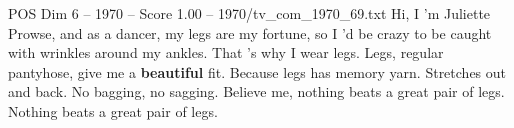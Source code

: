 \begin{textsample}{POS Dim 6 – 1970 – Score 1.00 – 1970/tv\_com\_1970\_69.txt}  \label{ex:f6_pos_035}
Hi, I 'm Juliette Prowse, and as a dancer, my legs are my fortune, so I 'd be crazy to be caught with wrinkles around my ankles.
That 's why I wear legs.
Legs, regular pantyhose, give me a \textbf{beautiful} fit.
Because legs has memory yarn.
Stretches out and back.
No bagging, no sagging.
Believe me, nothing beats a great pair of legs.
Nothing beats a great pair of legs.

\end{textsample}
